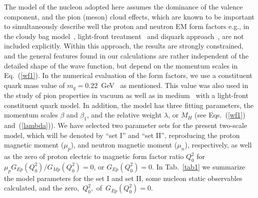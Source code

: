 \documentclass[preprint,aps,showpacs,floatfix]{revtex4}
\begin{document}
The model of the nucleon adopted here assumes the dominance of the valence component, 
and the pion (meson) cloud effects, which are known to be important to simultaneously 
describe well the proton and neutron EM form 
factors e.g., in the cloudy bag model~\cite{PionCloud1}, 
light-front treatment~\cite{PionCloud2} and diquark approach~\cite{PionCloud3}, 
are not included explicitly. Within this approach, the results are strongly constrained, 
and the general features found in our calculations are rather  
independent of the detailed shape of the wave function, 
but depend on the momentum scales in Eq.~(\ref{wf1}). 
In the numerical evaluation of the form factors, we use a constituent
quark mass value of $m_q = 0.22$~GeV~\cite{afsbw,card} as mentioned. 
This value was also used in the study of pion properties in 
vacuum as well as in medium~\cite{pimedium1,pimedium2,pimedium3,pimedium4} 
with a light-front constituent quark model.
In addition, the model has three fitting parameters, 
the momentum scales $\beta$ and $\beta_1$, and the relative weight $\lambda$, 
or $M_H$ (see Eqs.~(\ref{wf1}) and~(\ref{lambda})).
We have selected two parameter sets for the present two-scale model, 
which will be denoted by ``set I'' and ``set II'',  
reproducing the proton magnetic moment ($\mu_p$), 
and neutron magnetic moment ($\mu_n$), respectively,  
as well as the zero of proton electric to magnetic form factor ratio $Q^2_0$  
for $\mu_p G_{Ep}(Q^2_0) / G_{Mp} (Q^2_0) = 0$, or $G_{Ep}(Q^2_0) = 0$.
In Tab.~\ref{tab1} we summarize the model parameters for the set I and set II, 
some nucleon static observables calculated, and the zero,~$Q^2_0$,~of~$G_{Ep}(Q^2_0) = 0$. 
\end{document}
